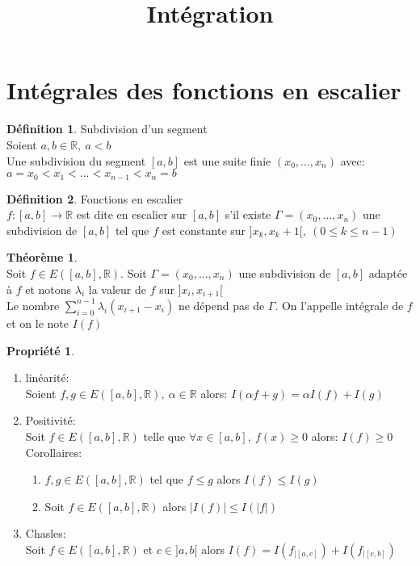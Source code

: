 \documentclass[fleqn]{article}
\title{Int\'egration}
\date{}
\theoremstyle{definition} \newtheorem*{defi}{D\'efinition}
\theoremstyle{definition} \newtheorem*{theo}{Th\'eor\`eme}
\theoremstyle{remark} \newtheorem*{rqs}{Remarques}
\theoremstyle{definition} \newtheorem*{prop}{Propri\'et\'e}
\begin{document}
\maketitle

\section{Int\'egrales des fonctions en escalier}
\begin{defi} Subdivision d'un segment\\
	Soient $a, b\in \mathbb{R},\ a<b$\\
	Une subdivision du segment $[a,b]$ est une suite finie $(x_0, \hdots, x_n)$ avec: \\ $a=x_0 < x_1 < \hdots < x_{n-1} <  x_n = b$
\end{defi}

\begin{defi} Fonctions en escalier\\
	$f: [a,b] \rightarrow \mathbb{R}$ est dite en escalier sur $[a,b]$ s'il existe $\Gamma = (x_0, \hdots, x_n)$ une subdivision de $[a,b]$
	tel que $f$ est constante sur $]x_k, x_k+1[,\ (0 \leq k \leq n-1)$
\end{defi}

\begin{theo} $ $\\
	Soit $f \in E([a,b], \mathbb{R})$. Soit $\Gamma = (x_0, \hdots, x_n)$ une subdivision de $[a,b]$ adapt\'ee \`a $f$ et notons $\lambda_i$
	la valeur de $f$ sur $]x_i, x_{i+1}[$ \\
	Le nombre $\sum_{i = 0}^{n-1} \lambda_i (x_{i+1} - x_i)$ ne d\'epend pas de $\Gamma$. On l'appelle int\'egrale de $f$ et on le note $I(f)$
\end{theo}

\begin{prop} $ $
	\begin{enumerate}
		\item lin\'earit\'e: \\
			Soient $f,g \in E([a,b], \mathbb{R}),\ \alpha \in \mathbb{R}$ alors: $I(\alpha f + g) = \alpha I(f) + I(g)$
		\item Positivit\'e: \\
			Soit $f \in E([a,b], \mathbb{R})$ telle que $\forall x \in [a,b],\ f(x) \geq 0$ alors: $I(f) \geq 0$ \\

			Corollaires:
			\begin{enumerate}
				\item $f,g \in E([a,b], \mathbb{R})$ tel que $f \leq g$ alors $I(f) \leq I(g)$
				\item Soit $f \in E([a,b], \mathbb{R})$ alors $|I(f)| \leq I(|f|)$
			\end{enumerate}
		\item Chasles: \\
			Soit $f \in E([a,b], \mathbb{R})$ et $c \in ]a,b[$ alors $I(f) = I(f_{|[a,c]}) + I(f_{|[c,b]})$
	\end{enumerate}
\end{prop}
\end{document}
